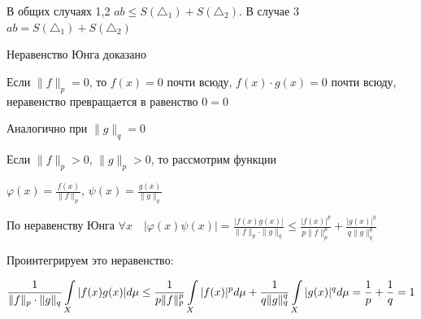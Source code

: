 \documentclass[a4paper]{report}
\newcommand*{\hm}[1]{#1\nobreak\discretionary{}%
            {\hbox{$\mathsurround=0pt #1$}}{}}
\begin{document}
\begin{figure}[h]
\begin{minipage}[h]{0.3\linewidth}
\end{minipage}
\hfill
\begin{minipage}[h]{0.3\linewidth}
\end{minipage}
\end{figure}

В общих случаях 1,2 $ab\le S(\triangle_1)+S(\triangle_2)$. В случае 3 $ab=S(\triangle_1)+S(\triangle_2)$

Неравенство Юнга доказано

Если $\|f\|_p=0$, то $f(x)=0$ почти всюду, $f(x)\cdot g(x)=0$ почти всюду, неравенство превращается в равенство $0=0$

Аналогично при $\|g\|_q=0$

Если $\|f\|_p>0$, $\|g\|_p>0$, то рассмотрим функции 

$\varphi(x)=\displaystyle\frac{f(x)}{\|f\|_p}$, $\psi(x)=\displaystyle\frac{g(x)}{\|g\|_q}$

По неравенству Юнга $\forall x\quad|\varphi(x)\psi(x)|=\displaystyle\frac{|f(x)g(x)|}{\|f\|_p\cdot\|g\|_q}\le\displaystyle\frac{|f(x)|^p}{p\|f\|_p^p}+\displaystyle\frac{|g(x)|^q}{q\|g\|_q^q}$

Проинтегрируем это неравенство:

$\displaystyle\frac1{\|f\|_p\cdot\|g\|_q}\displaystyle\int\limits_X|f(x)g(x)|d\mu\le\frac1{p\|f\|_p^p}\displaystyle\int\limits_X|f(x)|^pd\mu+\frac1{q\|g\|_q^q}\displaystyle\int\limits_X|g(x)|^qd\mu=\frac1p\hm+\frac1q=1$
\end{document}
